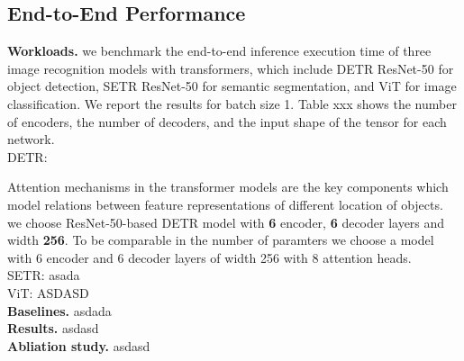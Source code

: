 \subsection{End-to-End Performance}
\textbf{Workloads.} we benchmark the end-to-end inference execution time of three image recognition models with transformers, which include DETR ResNet-50
for object detection, SETR ResNet-50 for semantic segmentation, and ViT for image classification. We report the results for batch size 1. Table xxx shows the 
number of encoders, the number of decoders, and the input shape of the tensor for each network. \\



{\color{red} DETR:}

Attention mechanisms in the transformer models are the key components which model relations between feature representations of different location of objects.
we choose ResNet-50-based DETR model with \textbf{6} encoder, \textbf{6} decoder layers and width \textbf{256}. 
To be comparable in the number of paramters we choose a model with 6 encoder and 6 decoder layers of width 256 with 8 attention heads. \\

{\color{red} SETR:}
asada \\

{\color{red} ViT:}
ASDASD \\



\textbf{Baselines.} asdada \\
\textbf{Results.} asdasd \\
\textbf{Abliation study.} asdasd \\



\label{sec:result}


